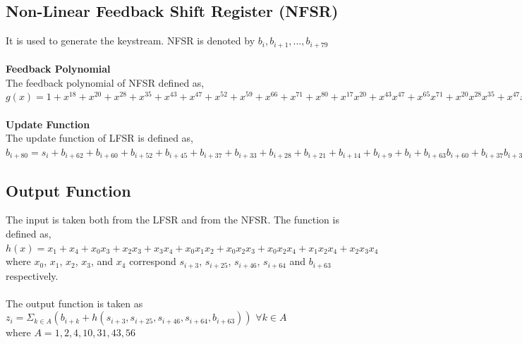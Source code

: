 \documentclass[11pt]{article}
\begin{document}
\subsection*{Non-Linear Feedback Shift Register (NFSR)} 
It is used to generate the keystream. NFSR is denoted by $b_{i},b_{i+1},...,b_{i+79}$ \\\\
\textbf{Feedback Polynomial}\\
The feedback polynomial of NFSR defined as, \\
$g(x) = 1 + x^{18} + x^{20} + x^{28} + x^{35} + x^{43} + x^{47} + x^{52} + x^{59} + x^{66} + x^{71} + x^{80} + x^{17}x^{20} + x^{43}x^{47} + x^{65}x^{71} + x^{20}x^{28}x^{35} + x^{47}x^{52}x^{59} + x^{17}x^{35}x^{52}x^{71} + x^{20}x^{28}x^{43}x^{47} + x^{17}x^{20}x^{59}x^{65} + x^{17}x^{20}x^{28}x^{35}x^{43} + x^{47}x^{52}x^{59}x^{65}x^{71} + x^{28}x^{35}x^{43}x^{47}x^{52}x^{59}$ \\\\
\textbf{Update Function}\\
The update function of LFSR is defined as,\\
$b_{i+80} = s_i + b_{i+62} + b_{i+60} + b_{i+52} + b_{i+45} + b_{i+37} + b_{i+33} + b_{i+28} + b_{i+21} + b_{i+14} + b_{i+9} + b_i + b_{i+63}b_{i+60} + b_{i+37}b_{i+33} + b_{i+15}b_{i+9} + b_{i+60}b_{i+52}b_{i+45} + b_{i+33}b_{i+28}b_{i+21} + b_{i+63}b_{i+45}b_{i+28}b_{i+9} +
b_{i+60}b_{i+52}b_{i+37}b_{i+33} + b_{i+63}b_{i+60}b_{i+21}b_{i+15} + 
b_{i+63}b_{i+60}b_{i+52}b_{i+45}b_{i+37} + b_{i+33}b_{i+28}b_{i+21}$ 

\subsection*{Output Function}
The input is taken both from the LFSR and from the NFSR. The function is defined as,\\
$h(x) = x_1 + x_4 + x_0x_3 + x_2x_3 + x_3x_4 + x_0x_1x_2 + x_0x_2x_3 + x_0x_2x_4 + x_1x_2x_4 + x_2x_3x_4$ \\
where $x_0$, $x_1$, $x_2$, $x_3$, and $x_4$ correspond $s_{i+3}$, $s_{i+25}$, $s_{i+46}$, $s_{i+64}$ and $b_{i+63}$ respectively. \\
\\
The output function is taken as\\
$z_i = \Sigma_{k \in A}( b_{i+k} + h(s_{i+3}, s_{i+25}, s_{i+46}, s_{i+64}, b_{i+63}))$ \hspace{2cm} $\forall k \in A$\\
where $A = {1, 2, 4, 10, 31, 43, 56}$ 
\end{document}
